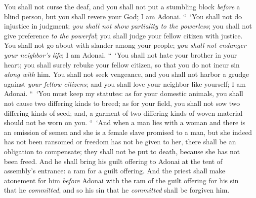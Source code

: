 \begin{biblechapter}
\verse You shall not curse the deaf, and you shall not put a stumbling block \textit{before} a blind person, but you shall revere your God; I am Adonai.
\verse “ ‘You shall not do injustice in judgment; \textit{you shall not show partiality to the powerless}; you shall not give preference \textit{to the powerful}; you shall judge your fellow citizen with justice.
\verse You shall not go about with slander among your people; \textit{you shall not endanger your neighbor’s life}; I am Adonai.
\verse “ ‘You shall not hate your brother in your heart; you shall surely rebuke your fellow citizen, so that you do not incur sin \textit{along with} him.
\verse You shall not seek vengeance, and you shall not harbor a grudge against \textit{your fellow citizens}; and you shall love your neighbor like yourself;  I am Adonai.
 “ ‘You must keep my statutes: as for your domestic animals, you shall not cause two differing kinds to breed; as for your field, you shall not sow two differing kinds of seed; and, a garment of two differing kinds of woven material should not be worn on you.
\verse “ ‘And when a man lies with a woman and there is an emission of semen and she is a female slave promised to a man, but she indeed has not been ransomed or freedom has not be given to her, there shall be an obligation to compensate; they shall not be put to death, because she has not been freed.
\verse And he shall bring his guilt offering to Adonai at the tent of assembly’s entrance: a ram for a guilt offering.
\verse And the priest shall make atonement for him \textit{before} Adonai with the ram of the guilt offering for his sin that he \textit{committed}, and so his sin that he \textit{committed} shall be forgiven him.

\end{biblechapter}
